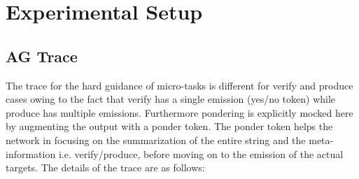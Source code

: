 %


\section{Experimental Setup}

\subsection{AG Trace}
The trace for the hard guidance of micro-tasks is different for verify and produce cases owing to the fact that verify has a single emission (yes/no token) while produce has multiple emissions. Furthermore pondering is explicitly mocked here by augmenting the output with a ponder token. The ponder token helps the network in focusing on the summarization of the entire string and the meta-information i.e. verify/produce, before moving on to the emission of the actual targets. The details of the trace are as follows:

